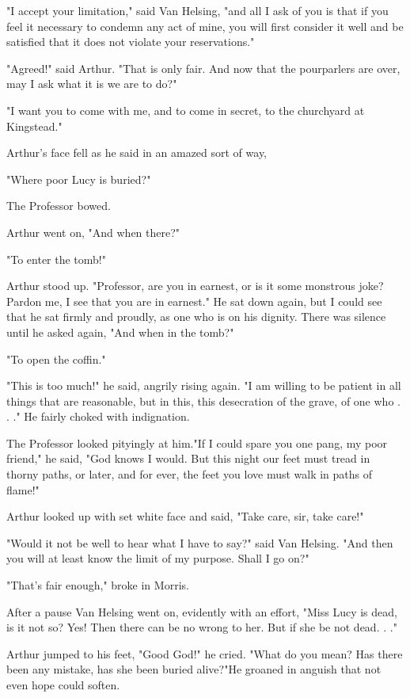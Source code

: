 "I accept your limitation," said Van Helsing, "and all I ask of you is that if you feel it necessary to condemn any act of mine, you will first consider it well and be satisfied that it does not violate your reservations." 

"Agreed!" said Arthur. "That is only fair. And now that the pourparlers are over, may I ask what it is we are to do?" 

"I want you to come with me, and to come in secret, to the churchyard at Kingstead." 

Arthur's face fell as he said in an amazed sort of way, 

"Where poor Lucy is buried?" 

The Professor bowed. 

Arthur went on, "And when there?" 

"To enter the tomb!" 

Arthur stood up. "Professor, are you in earnest, or is it some monstrous joke? Pardon me, I see that you are in earnest." He sat down again, but I could see that he sat firmly and proudly, as one who is on his dignity. There was silence until he asked again, "And when in the tomb?" 

"To open the coffin." 

"This is too much!" he said, angrily rising again. "I am willing to be patient in all things that are reasonable, but in this, this desecration of the grave, of one who . . ." He fairly choked with indignation. 

The Professor looked pityingly at him."If I could spare you one pang, my poor friend," he said, "God knows I would. But this night our feet must tread in thorny paths, or later, and for ever, the feet you love must walk in paths of flame!" 

Arthur looked up with set white face and said, "Take care, sir, take care!" 

"Would it not be well to hear what I have to say?" said Van Helsing. "And then you will at least know the limit of my purpose. Shall I go on?" 

"That's fair enough," broke in Morris. 

After a pause Van Helsing went on, evidently with an effort, "Miss Lucy is dead, is it not so? Yes! Then there can be no wrong to her. But if she be not dead. . ." 

Arthur jumped to his feet, "Good God!" he cried. "What do you mean? Has there been any mistake, has she been buried alive?"He groaned in anguish that not even hope could soften. 

